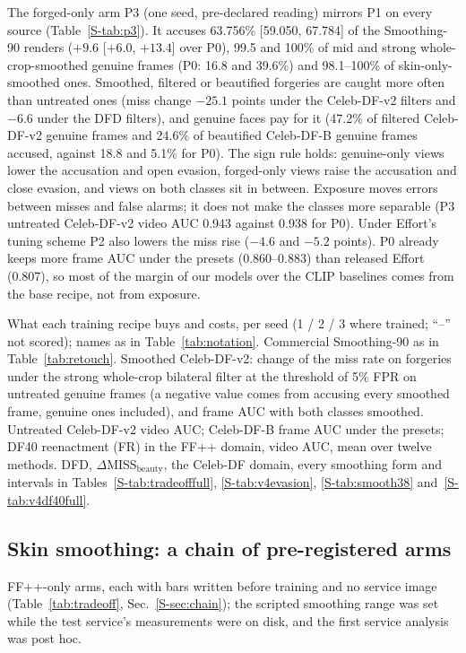 \documentclass[conference]{IEEEtran}
\begin{document}
The forged-only arm P3 (one seed, pre-declared reading) mirrors P1 on every source (Table~\ref{S-tab:p3}). It accuses 63.756\% [59.050, 67.784] of the Smoothing-90 renders ($+9.6$ [$+6.0$, $+13.4$]
over P0), 99.5 and 100\% of mid and strong whole-crop-smoothed genuine frames (P0: 16.8 and 39.6\%) and 98.1--100\% of
skin-only-smoothed ones. Smoothed, filtered or beautified forgeries are caught more often than untreated ones (miss change
$-25.1$ points under the Celeb-DF-v2 filters and $-6.6$ under the DFD filters), and genuine faces pay for it (47.2\% of filtered
Celeb-DF-v2 genuine frames and 24.6\% of beautified Celeb-DF-B genuine frames accused, against 18.8 and 5.1\% for P0). The sign
rule holds: genuine-only views lower the accusation and open evasion, forged-only views raise the accusation and close evasion,
and views on both classes sit in between. Exposure moves errors between misses and false alarms; it does not make the classes more
separable (P3 untreated Celeb-DF-v2 video AUC 0.943 against 0.938 for P0). Under Effort's tuning scheme P2 also lowers the miss
rise ($-4.6$ and $-5.2$ points). P0 already keeps more frame AUC under the presets (0.860--0.883) than released Effort (0.807), so
most of the margin of our models over the CLIP baselines comes from the base recipe, not from exposure.

\begin{table}[t]
\centering
\caption{What each training recipe buys and costs, per seed (1 / 2 / 3 where trained; ``--'' not scored); names as in
Table~\ref{tab:notation}. Commercial Smoothing-90 as in Table~\ref{tab:retouch}. Smoothed Celeb-DF-v2: change of the miss rate on
forgeries under the strong whole-crop bilateral filter at the threshold of 5\% FPR on untreated genuine frames (a negative value
comes from accusing every smoothed frame, genuine ones included), and frame AUC with both classes smoothed. Untreated Celeb-DF-v2
video AUC; Celeb-DF-B frame AUC under the presets; DF40 reenactment (FR) in the FF++ domain, video AUC, mean over twelve methods.
DFD, $\Delta$MISS$_\text{beauty}$, the Celeb-DF domain, every smoothing form and intervals in
Tables~\ref{S-tab:tradeofffull}, \ref{S-tab:v4evasion}, \ref{S-tab:smooth38} and~\ref{S-tab:v4df40full}.}
\label{tab:tradeoff}
\scriptsize
\setlength{\tabcolsep}{2.5pt}
\begin{adjustbox}{max width=\textwidth}\end{adjustbox}
\end{table}

\subsection{Skin smoothing: a chain of pre-registered arms}
\label{sec:chain}
FF++-only arms, each with bars written before training and no service image (Table~\ref{tab:tradeoff}, Sec.~\ref{S-sec:chain});
the scripted smoothing range was set while the test service's measurements were on disk, and the first service analysis was post hoc.
\end{document}
